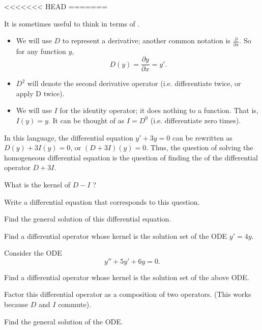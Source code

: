 
\begin{applicationActivities}

<<<<<<< HEAD
=======
\begin{observation}
It is sometimes useful to think in terms of .
\begin{itemize}
\item We will use \(D\) to represent a derivative; another common notation is \(\frac{\partial}{\partial x}\).  So for any function \(y\),  \[D(y)=\frac{\partial y}{\partial x}=y'.\]
\item \(D^2\) will denote the second derivative operator (i.e. differentiate twice, or apply D twice).
\item We will use \(I\) for the identity operator; it does nothing to a function.  That is, \(I(y)=y\).  It can be thought of as \(I=D^0\) (i.e. differentiate zero times).
\end{itemize}
\vfill
In this language, the differential equation \(y'+3y=0\) can be rewritten as \(D(y)+3I(y)=0\), or \( (D+3I)(y)=0\).
\vfill
Thus, the question of solving the homogeneous differential equation is the question of finding the  of the differential operator \(D+3I\).
\end{observation}

\begin{activity}{5}
What is the kernel of \(D-I\) ?
\vfill
\begin{subactivity}
Write a differential equation that corresponds to this question.
\end{subactivity}
\begin{subactivity}
Find the general solution of this differential equation.
\end{subactivity}
\end{activity}

\begin{activity}{5}
Find a differential operator whose kernel is the solution set of the ODE \(y'=4y\).
\end{activity}

\begin{activity}{10}
Consider the ODE \[y''+5y'+6y=0.\]
\vfill
\begin{subactivity}
Find a differential operator whose kernel is the solution set of the above ODE.
\end{subactivity}
\begin{subactivity}
Factor this differential operator as a composition of two operators. (This works because \(D\) and \(I\) commute).
\end{subactivity}
\begin{subactivity}
Find the general solution of the ODE.
\end{subactivity}
\end{activity}


\end{applicationActivities}
